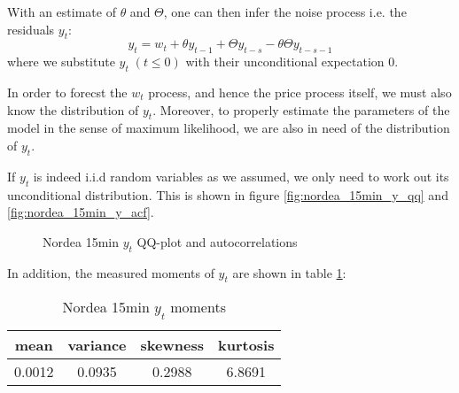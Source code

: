 \documentclass{book}
\begin{document}
With an estimate of $\theta$ and $\Theta$, one can then infer the
noise process i.e. the residuals $y_t$:
\begin{equation}
  \label{eq:infer_y}
  y_t = w_t + \theta y_{t-1} + \Theta y_{t-s} - \theta \Theta y_{t-s-1}  
\end{equation}
where we substitute $y_t\;(t \leq 0)$ with their unconditional
expectation 0.

In order to forecst the $w_t$ process, and hence the price process
itself, we must also know the distribution of $y_t$. Moreover, to
properly estimate the parameters of the model in the sense of maximum
likelihood, we are also in need of the distribution of $y_t$.

If $y_t$ is indeed i.i.d random variables as we assumed, we only need
to work out its unconditional distribution. This is shown in figure
\ref{fig:nordea_15min_y_qq} and \ref{fig:nordea_15min_y_acf}.
\begin{figure}[htb!]
  \centering
  \caption{Nordea 15min $y_t$ QQ-plot and autocorrelations}
\end{figure}
In addition, the measured moments of $y_t$ are shown in table
\ref{tab:nordea_15min_y_moments}:
\begin{table}[htb!]
  \centering
  \begin{tabular}{c|c|c|c}
    mean & variance & skewness & kurtosis \\
    \hline
    0.0012 & 0.0935 & 0.2988 & 6.8691
  \end{tabular}
  \caption{Nordea 15min $y_t$ moments}
  \label{tab:nordea_15min_y_moments}
\end{table}
\end{document}
